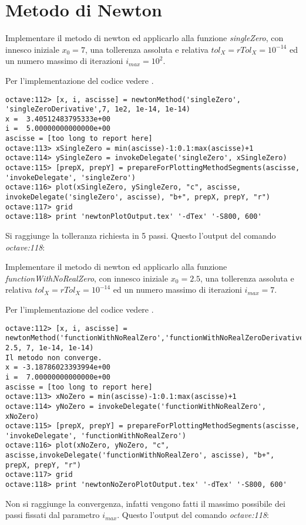 \section{Metodo di Newton}
\label{sec:metodoDiNewton}

\begin{exercise}
Implementare il metodo di newton ed applicarlo alla funzione \emph{singleZero},
con innesco iniziale $x_{0} = 7$, una tollerenza assoluta e relativa
$tol_{X} = rTol_{X} = 10^{-14}$ ed un numero massimo di iterazioni
$i_{max} = 10^{2}$.
\end{exercise}
Per l'implementazione del codice vedere .
\begin{lstlisting}
octave:112> [x, i, ascisse] = newtonMethod('singleZero', 'singleZeroDerivative',7, 1e2, 1e-14, 1e-14) 
x =  3.40512483795333e+00
i =  5.00000000000000e+00
ascisse = [too long to report here]
octave:113> xSingleZero = min(ascisse)-1:0.1:max(ascisse)+1
octave:114> ySingleZero = invokeDelegate('singleZero', xSingleZero)
octave:115> [prepX, prepY] = prepareForPlottingMethodSegments(ascisse, 'invokeDelegate', 'singleZero')
octave:116> plot(xSingleZero, ySingleZero, "c", ascisse, invokeDelegate('singleZero', ascisse), "b+", prepX, prepY, "r")
octave:117> grid
octave:118> print 'newtonPlotOutput.tex' '-dTex' '-S800, 600'
\end{lstlisting}
Si raggiunge la tolleranza richiesta in 5 passi. Questo l'output del comando
\emph{octave:118}:
\begin{center}

\end{center}

\begin{exercise}
Implementare il metodo di newton ed applicarlo alla funzione \emph{functionWithNoRealZero},
con innesco iniziale $x_{0} = 2.5$, una tollerenza assoluta e relativa
$tol_{X} = rTol_{X} = 10^{-14}$ ed un numero massimo di iterazioni
$i_{max} = 7$.
\end{exercise}
Per l'implementazione del codice vedere .
\begin{lstlisting}
octave:112> [x, i, ascisse] = newtonMethod('functionWithNoRealZero','functionWithNoRealZeroDerivative', 2.5, 7, 1e-14, 1e-14)
Il metodo non converge.
x = -3.18786023393994e+00
i =  7.00000000000000e+00
ascisse = [too long to report here]
octave:113> xNoZero = min(ascisse)-1:0.1:max(ascisse)+1
octave:114> yNoZero = invokeDelegate('functionWithNoRealZero', xNoZero)
octave:115> [prepX, prepY] = prepareForPlottingMethodSegments(ascisse, 'invokeDelegate', 'functionWithNoRealZero')
octave:116> plot(xNoZero, yNoZero, "c", ascisse,invokeDelegate('functionWithNoRealZero', ascisse), "b+", prepX, prepY, "r")
octave:117> grid
octave:118> print 'newtonNoZeroPlotOutput.tex' '-dTex' '-S800, 600'
\end{lstlisting}
Non si raggiunge la convergenza, infatti vengono fatti il massimo possibile
dei passi fissati dal parametro $i_{max}$. Questo l'output del comando \emph{octave:118}:
\begin{center}

\end{center}

